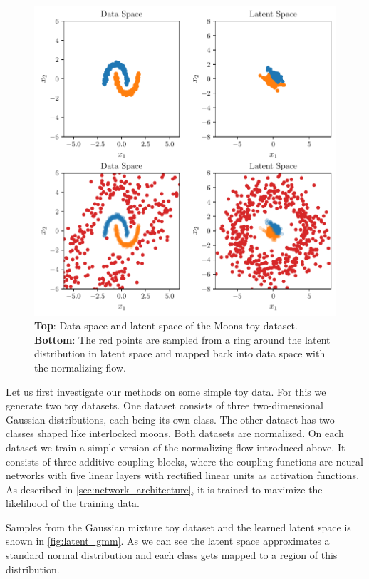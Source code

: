 \begin{figure}[htpb]
	\centering
        \includegraphics{figures/toy_example/moons/latent_mapping.pdf}
        \caption{\textbf{Top}: Data space and latent space of the Moons
        toy dataset. \textbf{Bottom}: The red points are sampled from a
    ring around the latent distribution in latent space and mapped back into
data space with the normalizing flow.}%
	\label{fig:latent_moons}
\end{figure}

Let us first investigate our methods on some simple toy data. For this we
generate two toy datasets. One dataset consists of three two-dimensional
Gaussian distributions, each being its own class. The other dataset has two
classes shaped like interlocked moons. Both datasets are normalized. On each
dataset we train a simple version of the normalizing flow introduced above. It
consists of three additive coupling blocks, where the coupling
functions are neural networks with five linear layers with rectified linear
units as activation functions. As described in
\autoref{sec:network_architecture}, it is trained to maximize the likelihood of
the training data.

Samples from the Gaussian mixture toy dataset and the learned latent space
is shown in \autoref{fig:latent_gmm}. As we can see
the latent space approximates a standard normal distribution and each class
gets mapped to a region of this distribution.


